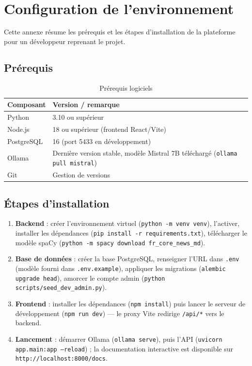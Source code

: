 \documentclass[12pt,a4paper]{report}
\begin{document}
\chapter{Configuration de l'environnement}

Cette annexe résume les prérequis et les étapes d'installation de la plateforme pour un développeur reprenant le projet.

\section{Prérequis}

\begin{table}[H]
\centering
\caption{Prérequis logiciels}
\label{tab:annexe-prerequis}
\small
\begin{tabularx}{\textwidth}{lX}
\toprule
\textbf{Composant} & \textbf{Version / remarque} \\
\midrule
Python & 3.10 ou supérieur \\
Node.js & 18 ou supérieur (frontend React/Vite) \\
PostgreSQL & 16 (port 5433 en développement) \\
Ollama & Dernière version stable, modèle Mistral 7B téléchargé (\texttt{ollama pull mistral}) \\
Git & Gestion de versions \\
\bottomrule
\end{tabularx}
\end{table}

\section{Étapes d'installation}

\begin{enumerate}
  \item \textbf{Backend} : créer l'environnement virtuel (\texttt{python -m venv venv}), l'activer, installer les dépendances (\texttt{pip install -r requirements.txt}), télécharger le modèle spaCy (\texttt{python -m spacy download fr\_core\_news\_md}).
  \item \textbf{Base de données} : créer la base PostgreSQL, renseigner l'URL dans \texttt{.env} (modèle fourni dans \texttt{.env.example}), appliquer les migrations (\texttt{alembic upgrade head}), amorcer le compte admin (\texttt{python scripts/seed\_dev\_admin.py}).
  \item \textbf{Frontend} : installer les dépendances (\texttt{npm install}) puis lancer le serveur de développement (\texttt{npm run dev}) --- le proxy Vite redirige \texttt{/api/*} vers le backend.
  \item \textbf{Lancement} : démarrer Ollama (\texttt{ollama serve}), puis l'API (\texttt{uvicorn app.main:app --reload}) ; la documentation interactive est disponible sur \texttt{http://localhost:8000/docs}.
\end{enumerate}
\end{document}
